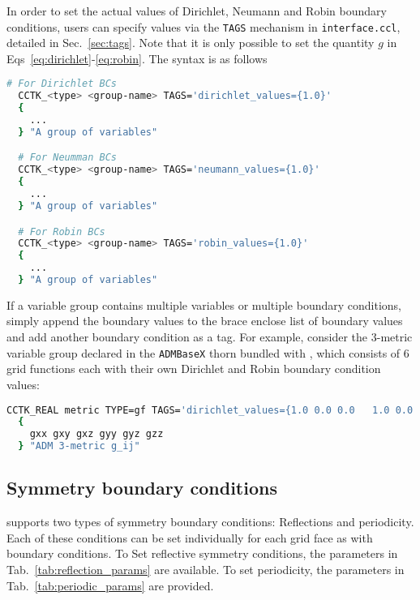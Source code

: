 In order to set the actual values of Dirichlet, Neumann and Robin boundary conditions, users can specify values via the \texttt{TAGS} mechanism in \texttt{interface.ccl}, detailed in Sec.~\ref{sec:tags}. Note that it is only possible to set the quantity $g$ in Eqs~\eqref{eq:dirichlet}-\eqref{eq:robin}. The syntax is as follows

\begin{lstlisting}[language=bash]
  # For Dirichlet BCs
  CCTK_<type> <group-name> TAGS='dirichlet_values={1.0}'
  {
    ...
  } "A group of variables"

  # For Neumman BCs
  CCTK_<type> <group-name> TAGS='neumann_values={1.0}'
  {
    ...
  } "A group of variables"

  # For Robin BCs
  CCTK_<type> <group-name> TAGS='robin_values={1.0}'
  {
    ...
  } "A group of variables"
\end{lstlisting}

If a variable group contains multiple variables or multiple boundary conditions, simply append the boundary values to the brace enclose list of boundary values and add another boundary condition as a tag. For example, consider the 3-metric variable group declared in the \texttt{ADMBaseX} thorn bundled with \CarpetX, which consists of 6 grid functions each with their own Dirichlet and Robin boundary condition values:

\begin{lstlisting}[language=bash]
  CCTK_REAL metric TYPE=gf TAGS='dirichlet_values={1.0 0.0 0.0   1.0 0.0   1.0} robin_values={1.0 0.0 0.0   1.0 0.0   1.0} ...'
  {
    gxx gxy gxz gyy gyz gzz
  } "ADM 3-metric g_ij"
\end{lstlisting}

\subsection{Symmetry boundary conditions}

\CarpetX\space supports two types of symmetry boundary conditions: Reflections and periodicity. Each of these conditions can be set individually for each grid face as with boundary conditions. To Set reflective symmetry conditions, the parameters in Tab.~\ref{tab:reflection_params} are available. To set periodicity, the parameters in Tab.~\ref{tab:periodic_params} are provided.

